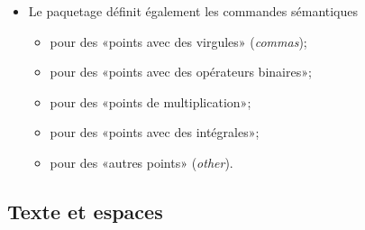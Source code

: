 \begin{itemize}
\begin{demo}
    \begin{texample}
\begin{lstlisting}
$x_1, \ldots, x_n$
\end{lstlisting}
      \producing
      $x_1, \ldots, x_n$
    \end{texample}

    \begin{texample}
\begin{lstlisting}
$x_1 + \dots + x_n$
\end{lstlisting}
      \producing
      $x_1 + \dots + x_n$
    \end{texample}

    \begin{texample}
\begin{lstlisting}
$x_1 + \cdots + x_n$
\end{lstlisting}
      \producing
      $x_1 + \cdots + x_n$
    \end{texample}
  \end{demo}
\item Le paquetage  définit également les commandes sémantiques
  \begin{itemize}
  \item \cmd{\dotsc} pour des «points avec des virgules» (\emph{commas});
  \item \cmd{\dotsb} pour des «points avec des opérateurs binaires»;
  \item \cmd{\dotsm} pour des «points de multiplication»;
  \item \cmd{\dotsi} pour des «points avec des intégrales»;
  \item \cmd{\dotso} pour des «autres points» (\emph{other}).
  \end{itemize}
\end{itemize}

\subsection{Texte et espaces}
\label{sec:math:bases:texte}

